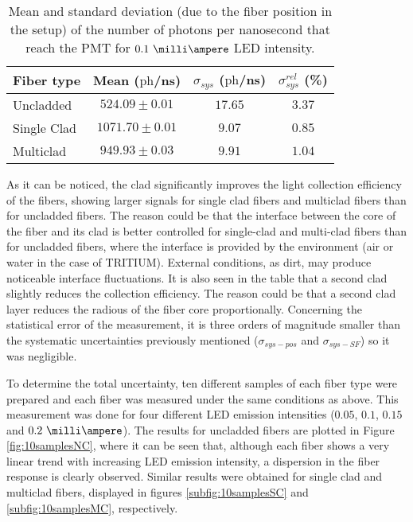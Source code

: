 \begin{table}[htbp]
\centering{}%
\begin{tabular}{lccc}
\toprule 
Fiber type & Mean ($\text{ph}$/ns) & $\sigma_{sys}$ ($\text{ph}$/ns) & $\sigma^{rel}_{sys}$ (\%) \tabularnewline
\midrule
\midrule 
Uncladded & $524.09 \pm 0.01$ & $17.65$ & $3.37$ \tabularnewline
Single Clad & $1071.70 \pm 0.01$ & $9.07$ & $0.85$ \tabularnewline
Multiclad & $949.93 \pm 0.03$ & $9.91$ & $1.04$ \tabularnewline
\bottomrule
\end{tabular}
\caption{Mean and standard deviation (due to the fiber position in the setup) of the number of photons per nanosecond that reach the PMT for $0.1~\milli\ampere$ LED intensity.}
\label{tab:PositionStandardDeviation}
\end{table}
As it can be noticed, the clad significantly improves the light collection efficiency of the fibers, showing larger signals for single clad fibers and multiclad fibers than for uncladded fibers. The reason could be that the interface between the core of the fiber and its clad is better controlled for single-clad and multi-clad fibers than for uncladded fibers, where the interface is provided by the environment (air or water in the case of TRITIUM). External conditions, as dirt, may produce noticeable interface fluctuations. It is also seen in the table that a second clad slightly reduces the collection efficiency. The reason could be that a second clad layer reduces the radious of the fiber core proportionally. Concerning the statistical error of the measurement, it is three orders of magnitude smaller than the systematic uncertainties previously mentioned ($\sigma_{sys-pos}$ and $\sigma_{sys-SF}$) so it was negligible.


To determine the total uncertainty, ten different samples of each fiber type were prepared and each fiber was measured under the same conditions as above. This measurement was done for four different LED emission intensities ($0.05$, $0.1$, $0.15$ and $0.2~\milli\ampere$). The results for uncladded fibers are plotted in Figure \ref{fig:10samplesNC}, where it can be seen that, although each fiber shows a very linear trend with increasing LED emission intensity, a dispersion in the fiber response is clearly observed. Similar results were obtained for single clad and multiclad fibers, displayed in figures \ref{subfig:10samplesSC} and \ref{subfig:10samplesMC}, respectively.

